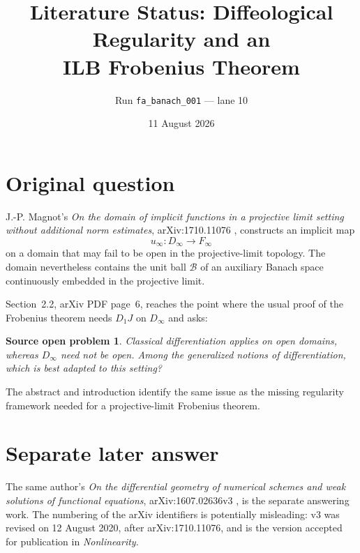 \documentclass[11pt]{article}
\title{Literature Status: Diffeological Regularity and an\\
ILB Frobenius Theorem}
\author{Run \texttt{fa\_banach\_001} --- lane 10}
\date{11 August 2026}
\newtheorem*{question}{Source open problem}
\begin{document}
\maketitle

\begin{center}
\end{center}

\section{Original question}

J.-P. Magnot's \emph{On the domain of implicit functions in a projective
limit setting without additional norm estimates}, arXiv:1710.11076
\cite{source}, constructs an implicit map
\[
 u_\infty:D_\infty\longrightarrow F_\infty
\]
on a domain that may fail to be open in the projective-limit topology.  The
domain nevertheless contains the unit ball $\mathcal B$ of an auxiliary
Banach space continuously embedded in the projective limit.

Section~2.2, arXiv PDF page~6, reaches the point where the usual proof of the
Frobenius theorem needs $D_1J$ on $D_\infty$ and asks:

\begin{question}
Classical differentiation applies on open domains, whereas $D_\infty$ need
not be open.  Among the generalized notions of differentiation, which is
best adapted to this setting?
\end{question}

The abstract and introduction identify the same issue as the missing
regularity framework needed for a projective-limit Frobenius theorem.

\section{Separate later answer}

The same author's \emph{On the differential geometry of numerical schemes
and weak solutions of functional equations}, arXiv:1607.02636v3
\cite{answerpaper}, is the separate answering work.  The numbering of the
arXiv identifiers is potentially misleading: v3 was revised on 12 August
2020, after arXiv:1710.11076, and is the version accepted for publication in
\emph{Nonlinearity}.
\end{document}

